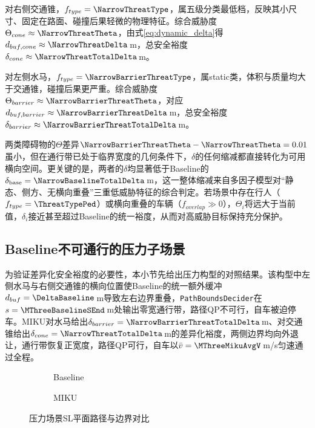 对右侧交通锥，$f_{type}=\NarrowThreatType$，属五级分类最低档，反映其小尺寸、固定在路面、碰撞后果轻微的物理特征。综合威胁度$\Theta_{cone}\approx\NarrowThreatTheta$，由式\eqref{eq:dynamic_delta}得$d_{buf,cone}\approx\NarrowThreatDelta$\,m，总安全裕度$\delta_{cone}\approx\NarrowThreatTotalDelta$\,m。

对左侧水马，$f_{type}=\NarrowBarrierThreatType$，属static类，体积与质量均大于交通锥，碰撞后果更严重。综合威胁度$\Theta_{barrier}\approx\NarrowBarrierThreatTheta$，对应$d_{buf,barrier}\approx\NarrowBarrierThreatDelta$\,m，总安全裕度$\delta_{barrier}\approx\NarrowBarrierThreatTotalDelta$\,m。

两类障碍物的$\Theta$差异$\NarrowBarrierThreatTheta-\NarrowThreatTheta=0.01$虽小，但在通行带已处于临界宽度的几何条件下，$\delta$的任何缩减都直接转化为可用横向空间。更关键的是，两者的$\delta$均显著低于Baseline的$\delta_{\mathrm{base}}=\NarrowBaselineTotalDelta$\,m，这一整体缩减来自多因子模型对“静态、侧方、无横向重叠”三重低威胁特征的综合判定。若场景中存在行人（$f_{type}=\ThreatTypePed$）或横向重叠的车辆（$f_{overlap}\gg 0$），$\Theta_i$将远大于当前值，$\delta_i$接近甚至超过Baseline的统一裕度，从而对高威胁目标保持充分保护。

\subsection{Baseline不可通行的压力子场景}

为验证差异化安全裕度的必要性，本小节先给出压力构型的对照结果。该构型中左侧水马与右侧交通锥的横向位置使Baseline的统一额外缓冲$d_{buf}=\DeltaBaseline$\,m导致左右边界重叠，\texttt{PathBoundsDecider}在$s=\MThreeBaselineSEnd$\,m处输出零宽通行带，路径QP不可行，自车被迫停车。MIKU对水马给出$\delta_{barrier}=\NarrowBarrierThreatTotalDelta$\,m、对交通锥给出$\delta_{cone}=\NarrowThreatTotalDelta$\,m的差异化裕度，两侧边界均向外退让，通行带恢复正宽度，路径QP可行，自车以$\bar{v}=\MThreeMikuAvgV$\,m/s匀速通过全程。

\begin{figure}[H]
\centering
\begin{subfigure}[b]{\textwidth}
  \centering
  
  \caption{Baseline}
  \label{fig:exp_ch5_pressure_sl:a}
\end{subfigure}

\begin{subfigure}[b]{\textwidth}
  \centering
  
  \caption{MIKU}
  \label{fig:exp_ch5_pressure_sl:b}
\end{subfigure}
\caption{压力场景SL平面路径与边界对比}
\label{fig:exp_ch5_pressure_sl}
\end{figure}

